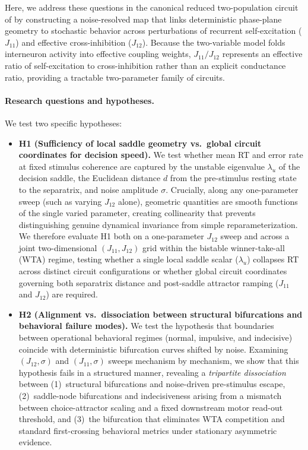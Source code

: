 \documentclass[11pt]{article}
\begin{document}
	Here, we address these questions in the canonical reduced two-population circuit of \citet{WongWang2006} by constructing a noise-resolved map that links deterministic phase-plane geometry to stochastic behavior across perturbations of recurrent self-excitation ($J_{11}$) and effective cross-inhibition ($J_{12}$). Because the two-variable model folds interneuron activity into effective coupling weights, $J_{11}/J_{12}$ represents an effective ratio of self-excitation to cross-inhibition rather than an explicit conductance ratio, providing a tractable two-parameter family of circuits.
	
	\paragraph{Research questions and hypotheses.} We test two specific hypotheses:
	\begin{itemize}[leftmargin=*]
		\item \textbf{H1 (Sufficiency of local saddle geometry vs.\ global circuit coordinates for decision speed).} We test whether mean RT and error rate at fixed stimulus coherence are captured by the unstable eigenvalue $\lambda_u$ of the decision saddle, the Euclidean distance $d$ from the pre-stimulus resting state to the separatrix, and noise amplitude $\sigma$. Crucially, along any one-parameter sweep (such as varying $J_{12}$ alone), geometric quantities are smooth functions of the single varied parameter, creating collinearity that prevents distinguishing genuine dynamical invariance from simple reparameterization. We therefore evaluate H1 both on a one-parameter $J_{12}$ sweep and across a joint two-dimensional $(J_{11},J_{12})$ grid within the bistable winner-take-all (WTA) regime, testing whether a single local saddle scalar ($\lambda_u$) collapses RT across distinct circuit configurations or whether global circuit coordinates governing both separatrix distance and post-saddle attractor ramping ($J_{11}$ and $J_{12}$) are required.
		\item \textbf{H2 (Alignment vs.\ dissociation between structural bifurcations and behavioral failure modes).} We test the hypothesis that boundaries between operational behavioral regimes (normal, impulsive, and indecisive) coincide with deterministic bifurcation curves shifted by noise. Examining $(J_{12},\sigma)$ and $(J_{11},\sigma)$ sweeps mechanism by mechanism, we show that this hypothesis fails in a structured manner, revealing a \emph{tripartite dissociation} between (1)~structural bifurcations and noise-driven pre-stimulus escape, (2)~saddle-node bifurcations and indecisiveness arising from a mismatch between choice-attractor scaling and a fixed downstream motor read-out threshold, and (3)~the bifurcation that eliminates WTA competition and standard first-crossing behavioral metrics under stationary asymmetric evidence.
	\end{itemize}
	
\end{document}
